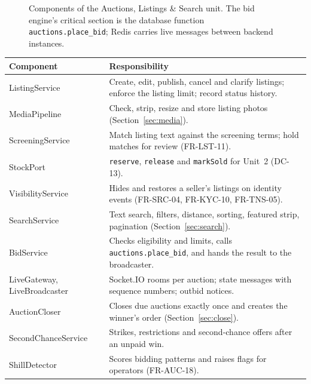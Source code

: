 \documentclass[11pt,a4paper]{article}
\newenvironment{dtable}[1]{\small\begin{longtable}{#1}}{\end{longtable}}
\begin{document}
\begin{figure}[!htbp]
{}
\caption{Components of the Auctions, Listings \& Search unit. The bid engine's critical section is the database function \texttt{auctions.place\_bid}; Redis carries live messages between backend instances.}
\label{fig:components}
\end{figure}

\begin{dtable}{@{}>{\raggedright\arraybackslash}p{3.4cm}>{\raggedright\arraybackslash}p{11.8cm}@{}}
\toprule
\textbf{Component} & \textbf{Responsibility} \\ \midrule \endhead
ListingService & Create, edit, publish, cancel and clarify listings; enforce the listing limit; record status history. \\
MediaPipeline & Check, strip, resize and store listing photos (Section~\ref{sec:media}). \\
ScreeningService & Match listing text against the screening terms; hold matches for review (FR-LST-11). \\
StockPort & \texttt{reserve}, \texttt{release} and \texttt{markSold} for Unit~2 (DC-13). \\
VisibilityService & Hides and restores a seller's listings on identity events (FR-SRC-04, FR-KYC-10, FR-TNS-05). \\
SearchService & Text search, filters, distance, sorting, featured strip, pagination (Section~\ref{sec:search}). \\
BidService & Checks eligibility and limits, calls \texttt{auctions.place\_bid}, and hands the result to the broadcaster. \\
LiveGateway, LiveBroadcaster & Socket.IO rooms per auction; state messages with sequence numbers; outbid notices. \\
AuctionCloser & Closes due auctions exactly once and creates the winner's order (Section~\ref{sec:close}). \\
SecondChanceService & Strikes, restrictions and second-chance offers after an unpaid win. \\
ShillDetector & Scores bidding patterns and raises flags for operators (FR-AUC-18). \\
\bottomrule
\end{dtable}
\end{document}
